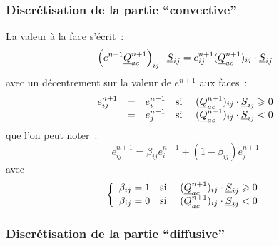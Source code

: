 \subsubsection*{Discrétisation de la partie ``convective''}

La valeur à la face s'écrit~:
\begin{equation}
\left(e^{n+1} \underline{Q}_{ac}^{n+1}\right)_{ij} \cdot \underline{S}_{ij}
= e_{ij}^{n+1}(\underline{Q}_{ac}^{n+1})_{ij} \cdot \underline{S}_{ij}
\end{equation}
avec un décentrement sur la valeur de $e^{n+1}$ aux faces~:
\begin{equation}
\begin{array}{lllll}
e_{ij}^{n+1}
& = & e_i^{n+1}
& \text{si\ } & (\underline{Q}_{ac}^{n+1})_{ij} \cdot \underline{S}_{ij} \geqslant 0 \\
& = & e_j^{n+1}
& \text{si\ } & (\underline{Q}_{ac}^{n+1})_{ij} \cdot \underline{S}_{ij} < 0 \\
\end{array}
\end{equation}
que l'on peut noter~:
\begin{equation}
 e_{ij}^{n+1}
 = \beta_{ij}e_i^{n+1} + (1-\beta_{ij})e_j^{n+1}
\end{equation}
avec
\begin{equation}
\left\{\begin{array}{lll}
\beta_{ij} = 1 & \text{si\ }
& (\underline{Q}_{ac}^{n+1})_{ij} \cdot \underline{S}_{ij} \geqslant 0 \\
\beta_{ij} = 0 & \text{si\ }
& (\underline{Q}_{ac}^{n+1})_{ij} \cdot \underline{S}_{ij} < 0 \\
\end{array}\right.
\end{equation}


\subsubsection*{Discrétisation de la partie ``diffusive''}

